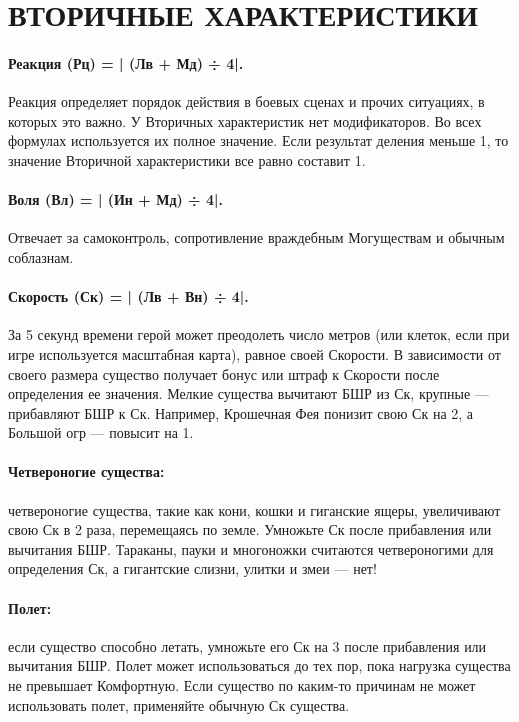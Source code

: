 %

\section{ВТОРИЧНЫЕ ХАРАКТЕРИСТИКИ}
\paragraph{Реакция (Рц) = | (Лв + Мд) ÷ 4|.} Реакция определяет порядок действия в боевых сценах и прочих ситуациях, в которых это важно. У Вторичных характеристик нет модификаторов. Во всех формулах используется их полное значение. Если результат деления меньше 1, то значение Вторичной характеристики все равно составит 1.
\paragraph{Воля (Вл) = | (Ин + Мд) ÷ 4|.} Отвечает за самоконтроль, сопротивление враждебным Могуществам и обычным соблазнам.
\paragraph{Скорость (Ск) = | (Лв + Вн) ÷ 4|.} За 5 секунд времени герой может преодолеть число метров (или клеток, если при игре используется масштабная карта), равное своей Скорости.
\newline
В зависимости от своего размера существо получает бонус или штраф к Скорости после определения ее значения. Мелкие существа вычитают БШР из Ск, крупные — прибавляют БШР к Ск. Например, Крошечная Фея понизит свою Ск на 2, а Большой огр — повысит на 1.
\paragraph{Четвероногие существа:} четвероногие существа, такие как кони, кошки и гиганские ящеры, увеличивают свою Ск в 2 раза, перемещаясь по земле. Умножьте Ск после прибавления или вычитания БШР. Тараканы, пауки и многоножки считаются четвероногими для определения Ск, а гигантские слизни, улитки и змеи — нет!
\paragraph{Полет:} если существо способно летать, умножьте его Ск на 3 после прибавления или вычитания БШР. Полет может использоваться до тех пор, пока нагрузка существа не превышает Комфортную. Если существо по каким-то причинам не может использовать полет, применяйте обычную Ск существа.
